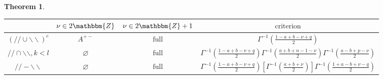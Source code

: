 \documentclass[12pt]{msjproc} %
\newcommand{\tmop}[1]{\ensuremath{\operatorname{#1}}}
\newtheorem{theorem}{Theorem}
\theoremstyle{definition}
\theoremstyle{exampstyle} \newtheorem{examp}[theorem]{Theorem}
\begin{document}
\begin{versiona}
\begin{theorem}
\begin{enumerate}
\begin{enumerate}
      \begin{center}
        \begin{center}
          \begin{center}
            \begin{center}
              \begin{tabular}{|c|c|c|c|}
                \hline
                & $\nu \in 2\mathbbm{Z}$ & $\nu \in 2\mathbbm{Z}+ 1$ &
                $\tmop{criterion}$\\
                \hline
                $(/ / \cup \backslash\backslash)^c$ & $A^{+ -}$ &
                $\tmop{full}$ & $\Gamma^{- 1} \left( \frac{1 - a + b - \nu +
                q}{2} \right)$\\
                \hline
                $/ / \cap \backslash\backslash, k < l$ & $\varnothing$ &
                $\tmop{full}$ & $\Gamma^{- 1} \left( \frac{1 - a + b - \nu +
                q}{2} \right) \Gamma^{- 1} \left( \frac{a + b + n - 1 -
                \nu}{2} \right) \Gamma^{- 1} \left( \frac{a - b + p - \nu}{2}
                \right)$\\
                \hline
                $/ / -\backslash\backslash$ & $\varnothing$ & $\tmop{full}$ &
                $\Gamma^{- 1} \left( \frac{1 - a + b - \nu + q}{2} \right)
                \left[ \Gamma^{- 1} \left( \frac{a + b + \nu}{2} \right)
                \right] \Gamma^{- 1} \left( \frac{1 + a - b + \nu - q}{2}
                \right)$\\
                \hline
              \end{tabular}
            \end{center}
          \end{center}
          
          \ 
        \end{center}
      \end{center}
      

\end{enumerate}
\end{enumerate}
\end{theorem}
\end{versiona}
\end{document}
